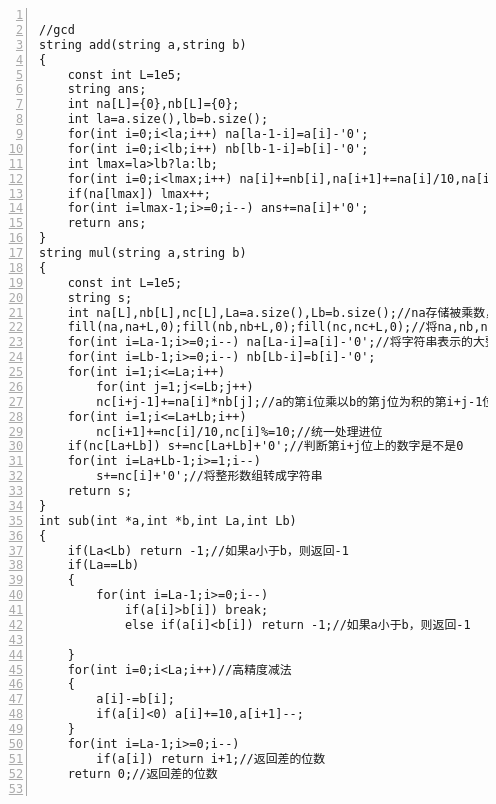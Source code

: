 \begin{lstlisting}[language={[ANSI]C},numbers=left]

//gcd
string add(string a,string b)
{
    const int L=1e5;
    string ans;
    int na[L]={0},nb[L]={0};
    int la=a.size(),lb=b.size();
    for(int i=0;i<la;i++) na[la-1-i]=a[i]-'0';
    for(int i=0;i<lb;i++) nb[lb-1-i]=b[i]-'0';
    int lmax=la>lb?la:lb;
    for(int i=0;i<lmax;i++) na[i]+=nb[i],na[i+1]+=na[i]/10,na[i]%=10;
    if(na[lmax]) lmax++;
    for(int i=lmax-1;i>=0;i--) ans+=na[i]+'0';
    return ans;
}
string mul(string a,string b)
{
    const int L=1e5;
    string s;
    int na[L],nb[L],nc[L],La=a.size(),Lb=b.size();//na存储被乘数，nb存储乘数，nc存储积
    fill(na,na+L,0);fill(nb,nb+L,0);fill(nc,nc+L,0);//将na,nb,nc都置为0
    for(int i=La-1;i>=0;i--) na[La-i]=a[i]-'0';//将字符串表示的大整形数转成i整形数组表示的大整形数
    for(int i=Lb-1;i>=0;i--) nb[Lb-i]=b[i]-'0';
    for(int i=1;i<=La;i++)
        for(int j=1;j<=Lb;j++)
        nc[i+j-1]+=na[i]*nb[j];//a的第i位乘以b的第j位为积的第i+j-1位（先不考虑进位）
    for(int i=1;i<=La+Lb;i++)
        nc[i+1]+=nc[i]/10,nc[i]%=10;//统一处理进位
    if(nc[La+Lb]) s+=nc[La+Lb]+'0';//判断第i+j位上的数字是不是0
    for(int i=La+Lb-1;i>=1;i--)
        s+=nc[i]+'0';//将整形数组转成字符串
    return s;
}
int sub(int *a,int *b,int La,int Lb)
{
    if(La<Lb) return -1;//如果a小于b，则返回-1
    if(La==Lb)
    {
        for(int i=La-1;i>=0;i--)
            if(a[i]>b[i]) break;
            else if(a[i]<b[i]) return -1;//如果a小于b，则返回-1

    }
    for(int i=0;i<La;i++)//高精度减法
    {
        a[i]-=b[i];
        if(a[i]<0) a[i]+=10,a[i+1]--;
    }
    for(int i=La-1;i>=0;i--)
        if(a[i]) return i+1;//返回差的位数
    return 0;//返回差的位数


\end{lstlisting}

